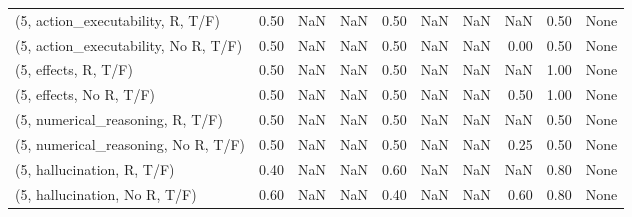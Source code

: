 \begin{table*}[h!]
\begin{adjustbox}{width=2\columnwidth,center}
\begin{tabular}{lrrr|rrr|rrr}
(5, action\_executability, R, T/F)    &                      0.50 &                   NaN &                       NaN &                          0.50 &                       NaN &                           NaN &                                    NaN &                               0.50 &                                  None \\
(5, action\_executability, No R, T/F) &                      0.50 &                   NaN &                       NaN &                          0.50 &                       NaN &                           NaN &                                   0.00 &                               0.50 &                                  None \\
(5, effects, R, T/F)                 &                      0.50 &                   NaN &                       NaN &                          0.50 &                       NaN &                           NaN &                                    NaN &                               1.00 &                                  None \\
(5, effects, No R, T/F)              &                      0.50 &                   NaN &                       NaN &                          0.50 &                       NaN &                           NaN &                                   0.50 &                               1.00 &                                  None \\
(5, numerical\_reasoning, R, T/F)     &                      0.50 &                   NaN &                       NaN &                          0.50 &                       NaN &                           NaN &                                    NaN &                               0.50 &                                  None \\
(5, numerical\_reasoning, No R, T/F)  &                      0.50 &                   NaN &                       NaN &                          0.50 &                       NaN &                           NaN &                                   0.25 &                               0.50 &                                  None \\
(5, hallucination, R, T/F)           &                      0.40 &                   NaN &                       NaN &                          0.60 &                       NaN &                           NaN &                                    NaN &                               0.80 &                                  None \\
(5, hallucination, No R, T/F)        &                      0.60 &                   NaN &                       NaN &                          0.40 &                       NaN &                           NaN &                                   0.60 &                               0.80 &                                  None \\

\end{tabular}
\end{adjustbox}
\end{table*}

